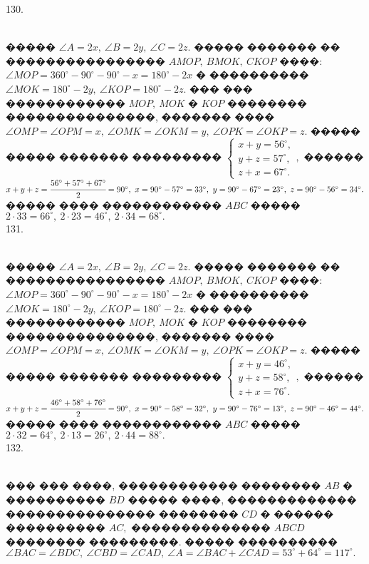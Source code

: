 \documentclass[12pt]{article}
\begin{document}
130. \begin{figure}[ht!]
\end{figure}\\
����� $\angle A=2x,\ \angle B=2y,\ \angle C=2z.$ ����� ������� �� ���������������� $AMOP,\ BMOK,\ CKOP$ ����: $\angle MOP=360^\circ-90^\circ-90^\circ-x=180^\circ-2x$ � ���������� $\angle MOK=180^\circ-2y,\ \angle KOP=180^\circ-2z.$ ��� ��� ������������ $MOP,\ MOK$ � $KOP$ �������� ���������������, ������� ���� $\angle OMP=\angle OPM=x,\ \angle OMK=\angle OKM=y,\ \angle OPK=\angle OKP=z.$ ����� ����� ������� ��������� $\begin{cases} x+y=56^\circ,\\ y+z=57^\circ,\\ z+x=67^\circ.\end{cases},$ ������ $x+y+z=\cfrac{56^\circ+57^\circ+67^\circ}{2}=90^\circ,\ x=90^\circ-57^\circ=33^\circ,\ y=90^\circ-67^\circ=23^\circ,\ z=90^\circ-56^\circ=34^\circ.$ ����� ���� ������������ $ABC$ ����� $2\cdot33=66^\circ,\ 2\cdot23=46^\circ,\ 2\cdot34=68^\circ.$\\
131. \begin{figure}[ht!]
\end{figure}\\
����� $\angle A=2x,\ \angle B=2y,\ \angle C=2z.$ ����� ������� �� ���������������� $AMOP,\ BMOK,\ CKOP$ ����: $\angle MOP=360^\circ-90^\circ-90^\circ-x=180^\circ-2x$ � ���������� $\angle MOK=180^\circ-2y,\ \angle KOP=180^\circ-2z.$ ��� ��� ������������ $MOP,\ MOK$ � $KOP$ �������� ���������������, ������� ���� $\angle OMP=\angle OPM=x,\ \angle OMK=\angle OKM=y,\ \angle OPK=\angle OKP=z.$ ����� ����� ������� ��������� $\begin{cases} x+y=46^\circ,\\ y+z=58^\circ,\\ z+x=76^\circ.\end{cases},$ ������ $x+y+z=\cfrac{46^\circ+58^\circ+76^\circ}{2}=90^\circ,\ x=90^\circ-58^\circ=32^\circ,\ y=90^\circ-76^\circ=13^\circ,\ z=90^\circ-46^\circ=44^\circ.$ ����� ���� ������������ $ABC$ ����� $2\cdot32=64^\circ,\ 2\cdot13=26^\circ,\ 2\cdot44=88^\circ.$\\
132. \begin{figure}[ht!]
\end{figure}\\
��� ��� ����, ������������ �������� $AB$ � ���������� $BD$ ����� ����, ������������� ��������������� �������� $CD$ � ������ ���������� $AC,$ �������������� $ABCD$ �������� ���������. ����� ���������� $\angle BAC=\angle BDC,\ \angle CBD=\angle CAD,\ \angle A=\angle BAC+\angle CAD=53^\circ+64^\circ=117^\circ.$\\
\end{document}
